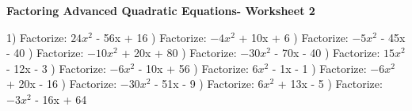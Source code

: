 \documentclass{article}%
\begin{document}
\newline%
\newline%
\newline%
\pagebreak%
\large%
\begin{center}%
\textbf{Factoring Advanced Quadratic Equations- Worksheet 2}%
\newline%
\newline%
\newline%
\end{center} \normalsize%
1) Factorize: $24x^2$ - 56x + 16%
\newline%
\newline%
) Factorize: $-4x^2$ + 10x + 6%
\newline%
\newline%
) Factorize: $-5x^2$ - 45x - 40%
\newline%
\newline%
) Factorize: $-10x^2$ + 20x + 80%
\newline%
\newline%
) Factorize: $-30x^2$ - 70x - 40%
\newline%
\newline%
) Factorize: $15x^2$ - 12x - 3%
\newline%
\newline%
) Factorize: $-6x^2$ - 10x + 56%
\newline%
\newline%
) Factorize: $6x^2$ - 1x - 1%
\newline%
\newline%
) Factorize: $-6x^2$ + 20x - 16%
\newline%
\newline%
) Factorize: $-30x^2$ - 51x - 9%
\newline%
\newline%
) Factorize: $6x^2$ + 13x - 5%
\newline%
\newline%
) Factorize: $-3x^2$ - 16x + 64%
\newline%
\end{document}
